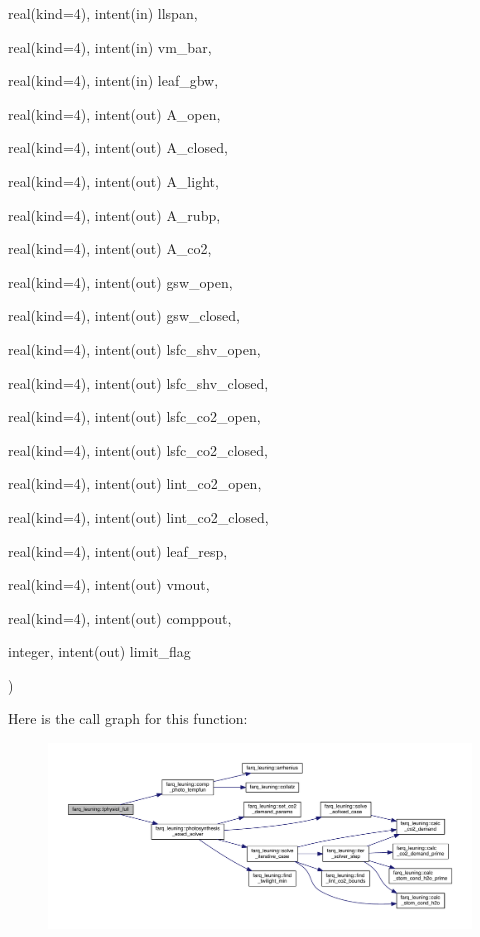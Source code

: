 {\begin{DoxyParamCaption}
\item[{real(kind=4), intent(in)}]{llspan, }
\item[{real(kind=4), intent(in)}]{vm\+\_\+bar, }
\item[{real(kind=4), intent(in)}]{leaf\+\_\+gbw, }
\item[{real(kind=4), intent(out)}]{A\+\_\+open, }
\item[{real(kind=4), intent(out)}]{A\+\_\+closed, }
\item[{real(kind=4), intent(out)}]{A\+\_\+light, }
\item[{real(kind=4), intent(out)}]{A\+\_\+rubp, }
\item[{real(kind=4), intent(out)}]{A\+\_\+co2, }
\item[{real(kind=4), intent(out)}]{gsw\+\_\+open, }
\item[{real(kind=4), intent(out)}]{gsw\+\_\+closed, }
\item[{real(kind=4), intent(out)}]{lsfc\+\_\+shv\+\_\+open, }
\item[{real(kind=4), intent(out)}]{lsfc\+\_\+shv\+\_\+closed, }
\item[{real(kind=4), intent(out)}]{lsfc\+\_\+co2\+\_\+open, }
\item[{real(kind=4), intent(out)}]{lsfc\+\_\+co2\+\_\+closed, }
\item[{real(kind=4), intent(out)}]{lint\+\_\+co2\+\_\+open, }
\item[{real(kind=4), intent(out)}]{lint\+\_\+co2\+\_\+closed, }
\item[{real(kind=4), intent(out)}]{leaf\+\_\+resp, }
\item[{real(kind=4), intent(out)}]{vmout, }
\item[{real(kind=4), intent(out)}]{comppout, }
\item[{integer, intent(out)}]{limit\+\_\+flag}
\end{DoxyParamCaption}
)}\label{namespacefarq__leuning_a93499fd595f405b9df3bf88c5be1569e}


Here is the call graph for this function\+:\nopagebreak
\begin{figure}[H]
\begin{center}
\leavevmode
\includegraphics[width=350pt]{namespacefarq__leuning_a93499fd595f405b9df3bf88c5be1569e_cgraph}
\end{center}
\end{figure}




